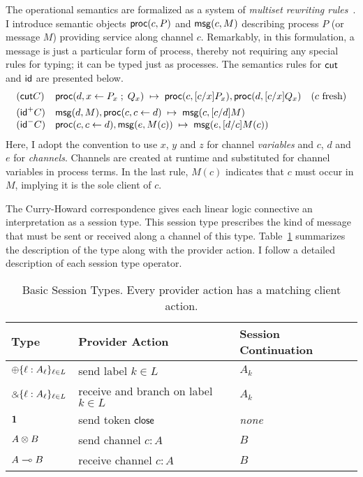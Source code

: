 The operational semantics are formalized as a system of \emph{multiset
rewriting rules}~\cite{Cervesato2009SSOS}. I introduce semantic objects
$\mathsf{proc}(c, P)$ and $\mathsf{msg}(c, M)$ describing process $P$ (or message $M$)
providing service along channel $c$. Remarkably, in this formulation,
a message is just a particular form of process, thereby not requiring any
special rules for typing; it can be typed just as processes. The semantics
rules for $\mathsf{cut}$ and $\mathsf{id}$ are presented below.
\[
\begin{array}{lll}
(\mathsf{cut}C) & \mathsf{proc}(d, x \leftarrow P_x \; ; \; Q_x) \; \mapsto \; \mathsf{proc}(c, [c/x]P_x),
\mathsf{proc}(d, [c/x]Q_x) & (c \text{ fresh}) \\[1ex]
(\mathsf{id}^+C) & \mathsf{msg}(d, M), \mathsf{proc}(c, c \leftarrow d) \; \mapsto \;
\mathsf{msg}(c, [c/d]M) \\
(\mathsf{id}^-C) & \mathsf{proc}(c, c \leftarrow d), \mathsf{msg}(e, M(c)) \; \mapsto \;
\mathsf{msg}(e, [d/c]M(c))
\end{array}
\]
Here, I adopt the convention to use $x$, $y$ and $z$ for channel
\emph{variables} and $c$, $d$ and $e$ for \emph{channels}. Channels are
created at runtime and substituted for channel variables in process terms.
In the last rule, $M(c)$ indicates that $c$ must occur in $M$, implying
it is the sole client of $c$.

The Curry-Howard correspondence gives each linear logic connective an
interpretation as a session type. This session type prescribes the kind of
message that must be sent or received along a channel of this type.
Table~\ref{tab:basic-types} summarizes the description of the type
along with the provider action. I follow a detailed description of each
session type operator.
\begin{table}[t]
\centering
\renewcommand{\arraystretch}{1.3}
\begin{tabular}{l|l|l}
\textbf{Type} & \textbf{Provider Action} & \textbf{Session Continuation} \\\hline
$\oplus \{ \ell : A_\ell \}_{\ell \in L}$ & send label $k \in L$ & $A_k$ \\
$\mathbin{\binampersand} \{ \ell : A_\ell \}_{\ell \in L}$ & receive and branch on label $k \in L$ & $A_k$ \\
$\mathbf{1}$ & send token $\mathsf{close}$ & \emph{none} \\
$A \otimes B$ & send channel $c : A$ & $B$ \\
$A \multimap B$ & receive channel $c : A$ & $B$
\end{tabular}
\caption{Basic Session Types.  Every provider action has a matching
client action.}
\label{tab:basic-types}
\end{table}

